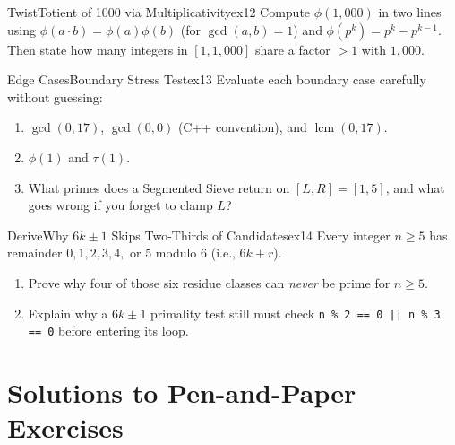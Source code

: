 \documentclass[11pt,a4paper]{article}
\theoremstyle{definition}
\begin{document}
\begin{tryitbox}{Twist}{Totient of 1000 via Multiplicativity}{ex12}
Compute $\phi(1{,}000)$ in two lines using $\phi(a \cdot b) = \phi(a)\phi(b)$ (for $\gcd(a, b) = 1$) and $\phi(p^k) = p^k - p^{k-1}$. Then state how many integers in $[1, 1{,}000]$ share a factor $> 1$ with $1{,}000$.
\end{tryitbox}

\begin{tryitbox}{Edge Cases}{Boundary Stress Test}{ex13}
Evaluate each boundary case carefully without guessing:
\begin{enumerate}
    \item $\gcd(0, 17)$,\; $\gcd(0, 0)$ (C++ convention), and $\operatorname{lcm}(0, 17)$.
    \item $\phi(1)$ and $\tau(1)$.
    \item What primes does a Segmented Sieve return on $[L, R] = [1, 5]$, and what goes wrong if you forget to clamp $L$?
\end{enumerate}
\end{tryitbox}

\begin{tryitbox}{Derive}{Why $6k \pm 1$ Skips Two-Thirds of Candidates}{ex14}
Every integer $n \ge 5$ has remainder $0, 1, 2, 3, 4,$ or $5$ modulo $6$ (i.e., $6k + r$).
\begin{enumerate}
    \item Prove why four of those six residue classes can \emph{never} be prime for $n \ge 5$.
    \item Explain why a $6k \pm 1$ primality test still must check \texttt{n \% 2 == 0 || n \% 3 == 0} before entering its loop.
\end{enumerate}
\end{tryitbox}

\section*{Solutions to Pen-and-Paper Exercises}
\end{document}
